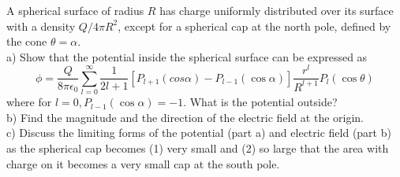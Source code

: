 \documentclass[12pt]{article}
\newenvironment{problem}[2][Problem]{\begin{trivlist}
\item[\hskip \labelsep {\bfseries #1}\hskip \labelsep {\bfseries #2.}]}{\end{trivlist}}
\begin{document}
\begin{problem}{2}
A spherical surface of radius $R$ has charge uniformly distributed over its surface with a density $Q/4\pi R^2$, except for a spherical cap at the north pole, defined by the cone $\theta=\alpha$.\\
a) Show that the potential inside the spherical surface can be expressed as
\[
\phi=\frac{Q}{8\pi\epsilon_0}\sum_{l=0}^{\infty}\frac{1}{2l+1}[P_{l+1}(cos\alpha)-P_{l-1}(\cos\alpha)]\frac{r^l}{R^{l+1}}P_l(\cos\theta)
\]
where for $l=0,P_{l-1}(\cos\alpha)=-1$. What is the potential outside?\\
b) Find the magnitude and the direction of the electric field at the origin.\\
c) Discuss the limiting forms of the potential (part a) and electric field (part b) as the spherical cap becomes (1) very small and (2) so large that the area with charge on it becomes a very small cap at the south pole.
\end{problem}
\end{document}
